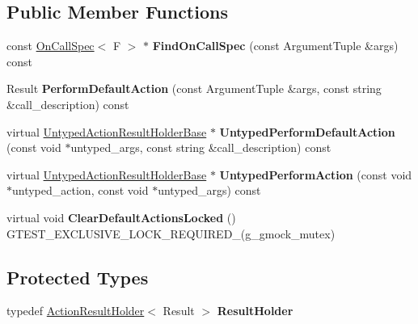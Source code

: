\subsection*{Public Member Functions}
\begin{DoxyCompactItemize}
\item 
\mbox{\label{classtesting_1_1internal_1_1_function_mocker_base_a3bcd2e8191ffc44bd59b8d8d25eefd3e}} 
const \hyperlink{classtesting_1_1internal_1_1_on_call_spec}{On\+Call\+Spec}$<$ F $>$ $\ast$ {\bfseries Find\+On\+Call\+Spec} (const Argument\+Tuple \&args) const
\item 
\mbox{\label{classtesting_1_1internal_1_1_function_mocker_base_adbef6e1af840c9c14c3a6acee01007b2}} 
Result {\bfseries Perform\+Default\+Action} (const Argument\+Tuple \&args, const string \&call\+\_\+description) const
\item 
\mbox{\label{classtesting_1_1internal_1_1_function_mocker_base_aed1c6248ba1b50437ee3a5f72c5f7bf3}} 
virtual \hyperlink{classtesting_1_1internal_1_1_untyped_action_result_holder_base}{Untyped\+Action\+Result\+Holder\+Base} $\ast$ {\bfseries Untyped\+Perform\+Default\+Action} (const void $\ast$untyped\+\_\+args, const string \&call\+\_\+description) const
\item 
\mbox{\label{classtesting_1_1internal_1_1_function_mocker_base_aebdb11fe4ea9e9f3984cbcd58c6f6cf9}} 
virtual \hyperlink{classtesting_1_1internal_1_1_untyped_action_result_holder_base}{Untyped\+Action\+Result\+Holder\+Base} $\ast$ {\bfseries Untyped\+Perform\+Action} (const void $\ast$untyped\+\_\+action, const void $\ast$untyped\+\_\+args) const
\item 
\mbox{\label{classtesting_1_1internal_1_1_function_mocker_base_ada818fcb2b892f21bb939def386599e7}} 
virtual void {\bfseries Clear\+Default\+Actions\+Locked} () G\+T\+E\+S\+T\+\_\+\+E\+X\+C\+L\+U\+S\+I\+V\+E\+\_\+\+L\+O\+C\+K\+\_\+\+R\+E\+Q\+U\+I\+R\+E\+D\+\_\+(g\+\_\+gmock\+\_\+mutex)
\end{DoxyCompactItemize}
\subsection*{Protected Types}
\begin{DoxyCompactItemize}
\item 
\mbox{\label{classtesting_1_1internal_1_1_function_mocker_base_aa4e1b2ee217676c9e70c3006b19a8074}} 
typedef \hyperlink{classtesting_1_1internal_1_1_action_result_holder}{Action\+Result\+Holder}$<$ Result $>$ {\bfseries Result\+Holder}
\end{DoxyCompactItemize}
